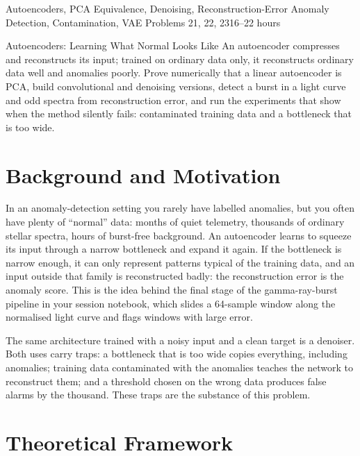 \documentclass[11pt,a4paper]{article}
\begin{document}
%
{Autoencoders, PCA Equivalence, Denoising, Reconstruction-Error Anomaly Detection, Contamination, VAE}%
{Problems 21, 22, 23}{16--22 hours}

\begin{summarybox}{Autoencoders: Learning What Normal Looks Like}
An autoencoder compresses and reconstructs its input; trained on ordinary data only, it reconstructs ordinary data well and anomalies poorly. Prove numerically that a linear autoencoder is PCA, build convolutional and denoising versions, detect a burst in a light curve and odd spectra from reconstruction error, and run the experiments that show when the method silently fails: contaminated training data and a bottleneck that is too wide.
\end{summarybox}


\section*{Background and Motivation}
In an anomaly-detection setting you rarely have labelled anomalies, but you often have plenty of ``normal'' data: months of quiet telemetry, thousands of ordinary stellar spectra, hours of burst-free background. An autoencoder learns to squeeze its input through a narrow bottleneck and expand it again. If the bottleneck is narrow enough, it can only represent patterns typical of the training data, and an input outside that family is reconstructed badly: the reconstruction error is the anomaly score. This is the idea behind the final stage of the gamma-ray-burst pipeline in your session notebook, which slides a 64-sample window along the normalised light curve and flags windows with large error.

The same architecture trained with a noisy input and a clean target is a denoiser. Both uses carry traps: a bottleneck that is too wide copies everything, including anomalies; training data contaminated with the anomalies teaches the network to reconstruct them; and a threshold chosen on the wrong data produces false alarms by the thousand. These traps are the substance of this problem.

\section*{Theoretical Framework}
\end{document}
